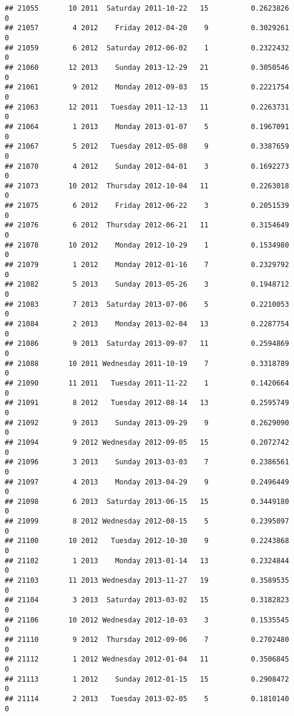 \documentclass[
]{article}
\begin{document}
\begin{verbatim}
## 21055       10 2011  Saturday 2011-10-22   15          0.2623826             0
## 21057        4 2012    Friday 2012-04-20    9          0.3029261             0
## 21059        6 2012  Saturday 2012-06-02    1          0.2322432             0
## 21060       12 2013    Sunday 2013-12-29   21          0.3050546             0
## 21061        9 2012    Monday 2012-09-03   15          0.2221754             0
## 21063       12 2011   Tuesday 2011-12-13   11          0.2263731             0
## 21064        1 2013    Monday 2013-01-07    5          0.1967091             0
## 21067        5 2012   Tuesday 2012-05-08    9          0.3387659             0
## 21070        4 2012    Sunday 2012-04-01    3          0.1692273             0
## 21073       10 2012  Thursday 2012-10-04   11          0.2263018             0
## 21075        6 2012    Friday 2012-06-22    3          0.2051539             0
## 21076        6 2012  Thursday 2012-06-21   11          0.3154649             0
## 21078       10 2012    Monday 2012-10-29    1          0.1534980             0
## 21079        1 2012    Monday 2012-01-16    7          0.2329792             0
## 21082        5 2013    Sunday 2013-05-26    3          0.1948712             0
## 21083        7 2013  Saturday 2013-07-06    5          0.2210053             0
## 21084        2 2013    Monday 2013-02-04   13          0.2287754             0
## 21086        9 2013  Saturday 2013-09-07   11          0.2594869             0
## 21088       10 2011 Wednesday 2011-10-19    7          0.3318789             0
## 21090       11 2011   Tuesday 2011-11-22    1          0.1420664             0
## 21091        8 2012   Tuesday 2012-08-14   13          0.2595749             0
## 21092        9 2013    Sunday 2013-09-29    9          0.2629090             0
## 21094        9 2012 Wednesday 2012-09-05   15          0.2072742             0
## 21096        3 2013    Sunday 2013-03-03    7          0.2386561             0
## 21097        4 2013    Monday 2013-04-29    9          0.2496449             0
## 21098        6 2013  Saturday 2013-06-15   15          0.3449180             0
## 21099        8 2012 Wednesday 2012-08-15    5          0.2395097             0
## 21100       10 2012   Tuesday 2012-10-30    9          0.2243868             0
## 21102        1 2013    Monday 2013-01-14   13          0.2324844             0
## 21103       11 2013 Wednesday 2013-11-27   19          0.3589535             0
## 21104        3 2013  Saturday 2013-03-02   15          0.3182823             0
## 21106       10 2012 Wednesday 2012-10-03    3          0.1535545             0
## 21110        9 2012  Thursday 2012-09-06    7          0.2702480             0
## 21112        1 2012 Wednesday 2012-01-04   11          0.3506845             0
## 21113        1 2012    Sunday 2012-01-15   15          0.2908472             0
## 21114        2 2013   Tuesday 2013-02-05    5          0.1810140             0
\end{verbatim}
\end{document}
